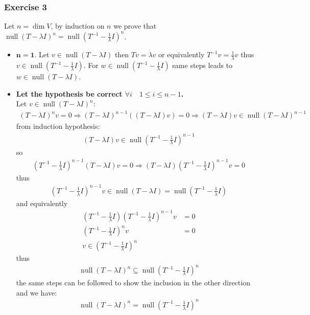 \documentclass[12pt, letterpaper]{scrartcl}
\DeclareMathOperator{\Null}{null}
\begin{document}
\subsubsection*{Exercise 3}
Let $n=\dim V$, by induction on $n$ we prove that $\Null(T-\lambda I)^n=\Null(T^{-1}-\frac{1}{\lambda}I)^n$.
\begin{itemize}
    \item $\mathbf{n=1}$. Let $v\in\Null(T-\lambda I)$ then $Tv=\lambda v$ or equivalently $T^{-1}v=\frac{1}{\lambda}v$ thus $v\in\Null(T^{-1}-\frac{1}{\lambda}I)$. For $w\in\Null(T^{-1}-\frac{1}{\lambda}I)$ same steps leads to $w\in\Null(T-\lambda I)$.
    \item \textbf{Let the hypothesis be correct $\forall i\quad 1\leq i \leq n-1$.}\\
    Let $v\in \Null(T-\lambda I)^n$:
    \begin{align*}
        (T-\lambda I)^nv=0 \Rightarrow (T-\lambda I)^{n-1}((T-\lambda I)v)=0 \Rightarrow (T-\lambda I)v\in \Null(T-\lambda I)^{n-1} 
    \end{align*}
    from induction hypothesis:
    \begin{align*}
        (T-\lambda I)v\in \Null(T^{-1}-\frac{1}{\lambda}I)^{n-1}
    \end{align*}
    so
    \begin{align*}
        (T^{-1}-\frac{1}{\lambda}I)^{n-1}(T-\lambda I)v=0 \Rightarrow (T-\lambda I)(T^{-1}-\frac{1}{\lambda}I)^{n-1}v=0
    \end{align*}
    thus
    \begin{align*}
        (T^{-1}-\frac{1}{\lambda}I)^{n-1}v\in\Null(T-\lambda I)=\Null(T^{-1}-\frac{1}{\lambda}I)
    \end{align*}
    and equivalently
    \begin{align*}
        (T^{-1}-\frac{1}{\lambda}I)(T^{-1}-\frac{1}{\lambda}I)^{n-1}v&=0\\
        (T^{-1}-\frac{1}{\lambda}I)^{n}v&=0\\
        v\in(T^{-1}-\frac{1}{\lambda}I)^{n}
    \end{align*}
    thus
    \begin{align*}
        \Null(T-\lambda I)^n\subseteq\Null(T^{-1}-\frac{1}{\lambda}I)^{n}
    \end{align*}
    the same steps can be followed to show the inclusion in the other direction and we have:
    \begin{align*}
        \Null(T-\lambda I)^n=\Null(T^{-1}-\frac{1}{\lambda}I)^n
    \end{align*}
\end{itemize}
\end{document}

